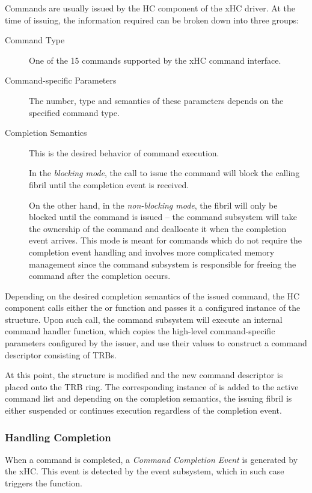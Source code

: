 Commands are usually issued by the HC component of the xHC driver. At the time
of issuing, the information required can be broken down into three groups:
~
\begin{description}
	\item[Command Type]
		One of the 15 commands supported by the xHC command interface.
	\item[Command-specific Parameters]
		The number, type and semantics of these parameters depends on the
		specified command type.
	\item[Completion Semantics]
		This is the desired behavior of command execution.

		In the \textit{blocking mode}, the call to issue the command will block
		the calling fibril until the completion event is received.

		On the other hand, in the \textit{non-blocking mode}, the fibril will
		only be blocked until the command is issued -- the command subsystem
		will take the ownership of the command and deallocate it when the
		completion event arrives. This mode is meant for commands which do not
		require the completion event handling and involves more complicated memory
		management since the command subsystem is responsible for freeing the
		command after the completion occurs.
\end{description}

Depending on the desired completion semantics of the issued command, the HC
component calls either the  or 
function and passes it a configured instance of the  structure.
Upon such call, the command subsystem will execute an internal command handler
function, which copies the high-level command-specific parameters configured by
the issuer, and use their values to construct a command descriptor consisting of
TRBs.

At this point, the  structure is modified and the new
command descriptor is placed onto the TRB ring. The corresponding instance of
 is added to the active command list and depending on the
completion semantics, the issuing fibril is either suspended or continues
execution regardless of the completion event.


\subsubsection{Handling Completion}

When a command is completed, a \textit{Command Completion Event} is generated by
the xHC. This event is detected by the event subsystem, which in such case
triggers the  function.

